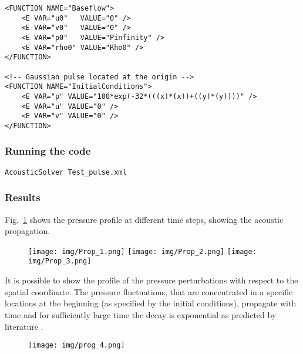 \begin{lstlisting}[style=XmlStyle]
<FUNCTION NAME="Baseflow"> 
    <E VAR="u0"   VALUE="0" />
    <E VAR="v0"   VALUE="0" />
    <E VAR="p0"   VALUE="Pinfinity" />
    <E VAR="rho0" VALUE="Rho0" />
</FUNCTION>

<!-- Gaussian pulse located at the origin -->
<FUNCTION NAME="InitialConditions">
    <E VAR="p" VALUE="100*exp(-32*(((x)*(x))+((y)*(y))))" />
    <E VAR="u" VALUE="0" />
    <E VAR="v" VALUE="0" />
</FUNCTION>
\end{lstlisting}

\subsubsection{Running the code}
\begin{lstlisting}[style=BashInputStyle]
AcousticSolver Test_pulse.xml
\end{lstlisting}

\subsubsection{Results}
Fig.~\ref{f:acousticsolver:results} shows the pressure profile at different
time steps, showing the acoustic propagation.

\begin{figure}
	\centering
	\texttt{[image: img/Prop\_1.png]}
	\texttt{[image: img/Prop\_2.png]}
	\texttt{[image: img/Prop\_3.png]}
	\caption{}
	\label{f:acousticsolver:results}
\end{figure}

It is possible to show the profile of the pressure perturbations with respect to
the spatial coordinate. The pressure fluctuations, that are concentrated  in a
specific locations at the beginning (as specified by the initial conditions),
propagate with time and for sufficiently large time the decay is exponential as
predicted by literature \cite{DoFf83}.

\begin{figure}
	\centering
	\texttt{[image: img/prog\_4.png]}
	\caption{}
\end{figure}

